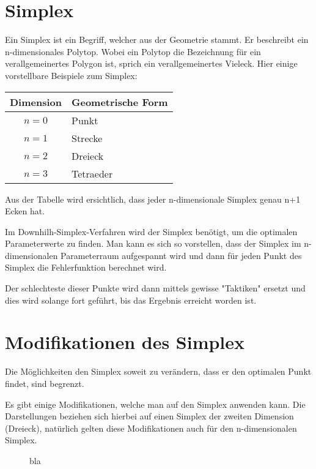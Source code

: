 \section{Simplex}
Ein Simplex ist ein Begriff, welcher aus der Geometrie stammt. Er beschreibt ein n-dimensionales Polytop. Wobei ein Polytop die Bezeichnung für ein verallgemeinertes Polygon ist, sprich ein verallgemeinertes Vieleck. 
Hier einige vorstellbare Beispiele zum Simplex:\\
 
\begin{tabular}{c|l}
Dimension & Geometrische Form\\
\hline
$n=0$ & Punkt\\
$n=1$ & Strecke\\
$n=2$ & Dreieck\\
$n=3$ & Tetraeder
\end{tabular} 

Aus der Tabelle wird ersichtlich, dass jeder n-dimensionale Simplex genau n+1 Ecken hat.

Im Downhilh-Simplex-Verfahren wird der Simplex benötigt, um die optimalen Parameterwerte zu finden. Man kann es sich so vorstellen, dass der Simplex im n-dimensionalen Parameterraum aufgespannt wird und dann für jeden Punkt des Simplex die Fehlerfunktion berechnet wird.

Der schlechteste dieser Punkte wird dann mittels gewisse "Taktiken" ersetzt und dies wird solange fort geführt, bis das Ergebnis erreicht worden ist. 


\section{Modifikationen des Simplex}
Die Möglichkeiten den Simplex soweit zu verändern, dass er den optimalen Punkt findet, sind begrenzt.

Es gibt einige Modifikationen, welche man auf den Simplex anwenden kann. Die Darstellungen beziehen sich hierbei auf einen Simplex der zweiten Dimension (Dreieck), natürlich gelten diese Modifikationen auch für den n-dimensionalen Simplex.

\begin{figure}[h]
	\centering
  	\caption{bla}%
	\label{fig:Dreiecke}%
\end{figure}


